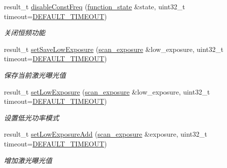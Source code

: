 \begin{DoxyCompactItemize}
result\+\_\+t \hyperlink{classydlidar_1_1_y_dlidar_driver_ae4b3883dd18bf01737bc4783d2dae974}{disable\+Const\+Freq} (\hyperlink{structfunction__state}{function\+\_\+state} \&state, uint32\+\_\+t timeout=\hyperlink{classydlidar_1_1_y_dlidar_driver_a13a4f2dc4067b43794b2c47c06d5d27aa07c79ce96f468ff4b40495ef84584442}{D\+E\+F\+A\+U\+L\+T\+\_\+\+T\+I\+M\+E\+O\+UT})
\begin{DoxyCompactList}\small\item\em 关闭恒频功能 ~\newline
\end{DoxyCompactList}\item 
result\+\_\+t \hyperlink{classydlidar_1_1_y_dlidar_driver_a73ef6628afc1eadf2f3079db99b383c6}{set\+Save\+Low\+Exposure} (\hyperlink{structscan__exposure}{scan\+\_\+exposure} \&low\+\_\+exposure, uint32\+\_\+t timeout=\hyperlink{classydlidar_1_1_y_dlidar_driver_a13a4f2dc4067b43794b2c47c06d5d27aa07c79ce96f468ff4b40495ef84584442}{D\+E\+F\+A\+U\+L\+T\+\_\+\+T\+I\+M\+E\+O\+UT})
\begin{DoxyCompactList}\small\item\em 保存当前激光曝光值 ~\newline
\end{DoxyCompactList}\item 
result\+\_\+t \hyperlink{classydlidar_1_1_y_dlidar_driver_a02257e37b792870a9c42f8abfbe543ad}{set\+Low\+Exposure} (\hyperlink{structscan__exposure}{scan\+\_\+exposure} \&low\+\_\+exposure, uint32\+\_\+t timeout=\hyperlink{classydlidar_1_1_y_dlidar_driver_a13a4f2dc4067b43794b2c47c06d5d27aa07c79ce96f468ff4b40495ef84584442}{D\+E\+F\+A\+U\+L\+T\+\_\+\+T\+I\+M\+E\+O\+UT})
\begin{DoxyCompactList}\small\item\em 设置低光功率模式 ~\newline
\end{DoxyCompactList}\item 
result\+\_\+t \hyperlink{classydlidar_1_1_y_dlidar_driver_a3f34ad1119b9b97c4af3936e80c182f4}{set\+Low\+Exposure\+Add} (\hyperlink{structscan__exposure}{scan\+\_\+exposure} \&exposure, uint32\+\_\+t timeout=\hyperlink{classydlidar_1_1_y_dlidar_driver_a13a4f2dc4067b43794b2c47c06d5d27aa07c79ce96f468ff4b40495ef84584442}{D\+E\+F\+A\+U\+L\+T\+\_\+\+T\+I\+M\+E\+O\+UT})
\begin{DoxyCompactList}\small\item\em 增加激光曝光值 ~\newline
\end{DoxyCompactList}\item 

\end{DoxyCompactItemize}
